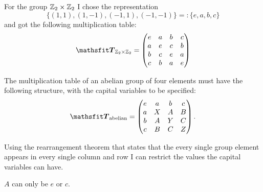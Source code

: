 \documentclass[11pt, ngerman, fleqn, DIV=15, headinclude, BCOR=1cm]{scrartcl}
\begin{document}
For the group $\mathbb Z_2 \times \mathbb Z_2$ I chose the representation
\[
    \{(1, 1), (1, -1), (-1, 1), (-1, -1)\} =: \{e, a, b, c\}
\]
and got the following multiplication table:
\[
    \tens T_{\Z_2 \times \Z_2} =
    \begin{pmatrix}
        e & a & b & c \\
        a & e & c & b \\
        b & c & e & a \\
        c & b & a & e
    \end{pmatrix}
\]

The multiplication table of an abelian group of four elements must have the
following structure, with the capital variables to be specified:
\[
    \tens T_\text{abelian} =
    \begin{pmatrix}
        e & a & b & c \\
        a & X & A & B \\
        b & A & Y & C \\
        c & B & C & Z
    \end{pmatrix}.
\]

Using the rearrangement theorem that states that the every single group
element appears in every single column and row I can restrict the values the
capital variables can have.

$A$ can only be $e$ or $c$.
\end{document}
